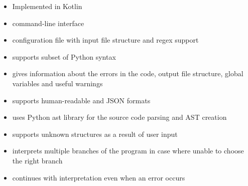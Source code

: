 \Large
\begin{itemize}
    \item Implemented in Kotlin
    \item command-line interface
    \item configuration file with input file structure and regex support
    \item supports subset of Python syntax
    \item gives information about the errors in the code, output file structure, global variables and useful warnings
    \item supports human-readable and JSON formats
    \item uses Python ast library for the source code parsing and AST creation
    \item supports unknown structures as a result of user input
    \item interprets multiple branches of the program in case where unable to choose the right branch
    \item continues with interpretation even when an error occurs

\end{itemize} %
